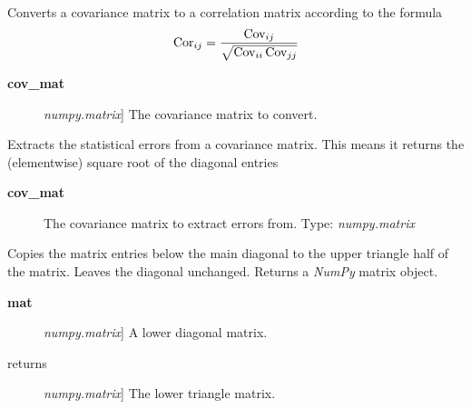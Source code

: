 \documentclass[a4paper,10pt,english]{sphinxmanual}
\begin{document}

\begin{fulllineitems}
\label{module_doc:kafe.numeric_tools.cov_to_cor}
Converts a covariance matrix to a correlation matrix according to the
formula
\begin{gather}
\begin{split}\text{Cor}_{ij} = \frac{\text{Cov}_{ij}}
    {\sqrt{ \text{Cov}_{ii}\,\text{Cov}_{jj}}}\end{split}\notag
\end{gather}\begin{description}
\item[{\textbf{cov\_mat}}] \leavevmode{[}\emph{numpy.matrix}{]}
The covariance matrix to convert.

\end{description}

\end{fulllineitems}


\begin{fulllineitems}
\label{module_doc:kafe.numeric_tools.extract_statistical_errors}
Extracts the statistical errors from a covariance matrix. This means
it returns the (elementwise) square root of the diagonal entries
\begin{description}
\item[{\textbf{cov\_mat}}] \leavevmode
The covariance matrix to extract errors from. Type: \emph{numpy.matrix}

\end{description}

\end{fulllineitems}


\begin{fulllineitems}
\label{module_doc:kafe.numeric_tools.make_symmetric_lower}
Copies the matrix entries below the main diagonal to the upper triangle
half of the matrix. Leaves the diagonal unchanged. Returns a \emph{NumPy} matrix
object.
\begin{description}
\item[{\textbf{mat}}] \leavevmode{[}\emph{numpy.matrix}{]}
A lower diagonal matrix.

\item[{returns}] \leavevmode{[}\emph{numpy.matrix}{]}
The lower triangle matrix.

\end{description}

\end{fulllineitems}
\end{document}
